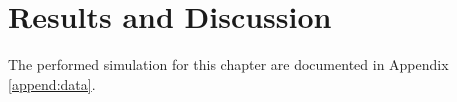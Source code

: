
\chapter{Results and Discussion}
\label{chap:results}

\thispagestyle{empty}
\newpage

The performed simulation for this chapter are documented in Appendix \ref{append:data}.